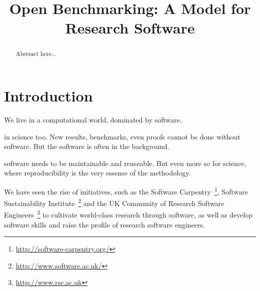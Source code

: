 \documentclass[conference]{IEEEtran}
\begin{document}
%
\title{Open Benchmarking: A Model for Research Software}

\author{
\and
{}
\and
{}
 }

\maketitle

\begin{abstract}
Abstract here...
\end{abstract}

\IEEEpeerreviewmaketitle

\section{Introduction}

We live in a computational world, dominated by software.

in science too. New results, benchmarks, even proofs cannot be done
without software. But the software is often in the background.

software needs to be maintainable and reuseable. But even more so for
science, where reproducibility is the very essense of the methodology.

We have seen the rise of initiatives, such as the Software
Carpentry~\footnote{\url{http://software-carpentry.org/}}, Software
Sustainability Institute~\footnote{\url{http://www.software.ac.uk/}}
and the UK Community of Research Software
Engineers~\footnote{\url{http://www.rse.ac.uk}} to cultivate
world-class research through software, as well as develop software
skills and raise the profile of research software engineers.
\end{document}
